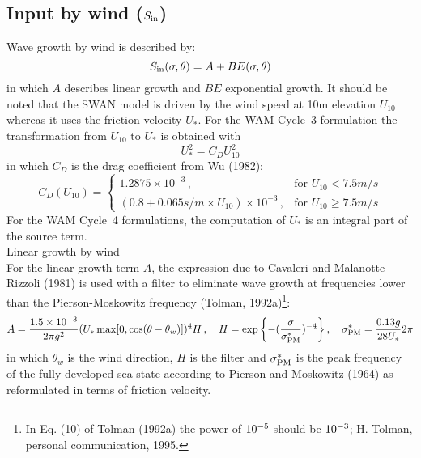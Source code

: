 \documentclass[12pt]{book}
\begin{document}
\subsection{Input by wind ($S_{\rm in}$)} \label{sec:inpwn}

Wave growth by wind is described by:
\begin{equation}
  S_{\rm in} (\sigma, \theta) = A + B E(\sigma,\theta)
  \label{eq3-1}
\end{equation}
in which $A$ describes linear growth and $BE$ exponential growth. It should be noted that the SWAN model
is driven by the wind speed at 10m elevation $U _{10}$ whereas it uses the friction velocity
$U _{*}$. For the WAM Cycle~3 formulation the transformation from $U _{10}$ to $U _{*}$ is obtained with
\begin{equation}
  U^2_* = C_D U^2_{10}
  \label{eq3-2}
\end{equation}
in which $C_D$ is the drag coefficient from Wu (1982):
\begin{equation}
  C_D(U_{10}) =
    \left\{
      \begin{array}{ll}
         1.2875 \times 10^{-3} \, , & \mbox{for } U_{10} < 7.5 m/s\\
         (0.8 + 0.065 s/m \times U_{10}) \times 10^{-3} \, , & \mbox{for }  U_{10} \geq 7.5 m/s
      \end{array}
    \right.
  \label{eq3-3}
\end{equation}
For the WAM Cycle~4 formulations, the computation of $U _{*}$ is an integral part of the source term.
\\[2ex]
\noindent
\underline{Linear growth by wind}\\[2ex]
For the linear growth term $A$, the expression due to Cavaleri and Malanotte-Rizzoli (1981) is used with a
filter to eliminate wave growth at frequencies lower than the Pierson-Moskowitz frequency (Tolman,
1992a)\footnote{In Eq. (10) of Tolman (1992a) the power of $10^{\rm -5}$ should be $10^{\rm -3}$; H. Tolman, personal
communication, 1995.}:
\begin{equation}
  A = \frac{1.5 \times 10^{-3}}{2 \pi g^2} (U_* \max [0,\cos(\theta-\theta_w)])^4 H\, , \quad
  H = \exp{ \left \{ -(\frac{\sigma}{\sigma^{*}_{\rm PM}})^{-4} \right\} }\, , \quad
  \sigma_{\rm PM}^{*} = \frac{0.13 g}{28 U_*} 2 \pi
  \label{eq3-4}
\end{equation}
in which $\theta_w$ is the wind direction, $H$ is the filter and $\sigma^{*}_{\rm PM}$ is the peak frequency of the
fully developed sea state according to Pierson and Moskowitz (1964) as reformulated in terms of friction velocity.
\end{document}
